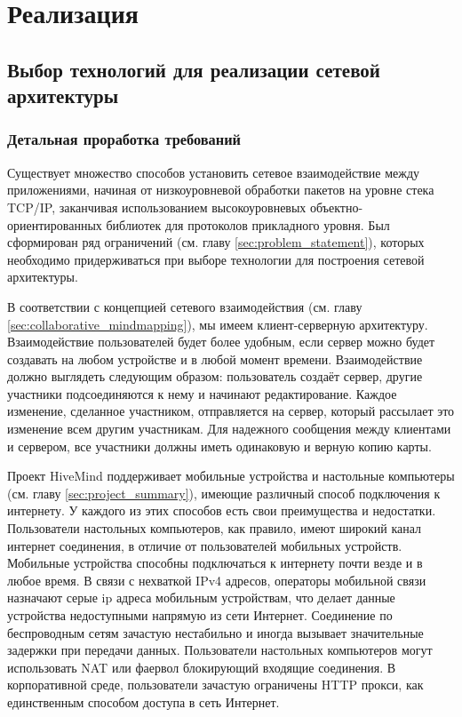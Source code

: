 \newpage

\chapter{Реализация}
\label{ch:chapter_2}

\section{Выбор технологий для реализации сетевой архитектуры}

\subsection{Детальная проработка требований}
Существует множество способов установить сетевое взаимодействие между
приложениями, начиная от низкоуровневой обработки пакетов на уровне стека
TCP/IP, заканчивая использованием высокоуровневых объектно-ориентированных
библиотек для протоколов прикладного уровня. Был сформирован ряд ограничений
(см. главу \ref{sec:problem_statement}), которых необходимо придерживаться при
выборе технологии для построения сетевой архитектуры.

В соответствии с концепцией сетевого взаимодействия (см. главу
\ref{sec:collaborative_mindmapping}), мы имеем клиент-серверную архитектуру.
Взаимодействие пользователей будет более удобным, если сервер можно будет
создавать на любом устройстве и в любой момент времени. Взаимодействие должно
выглядеть следующим образом: пользователь создаёт сервер, другие участники
подсоединяются к нему и начинают редактирование. Каждое изменение, сделанное
участником, отправляется на сервер, который рассылает это изменение всем другим
участникам. Для надежного сообщения между клиентами и сервером, все участники
должны иметь одинаковую и верную копию карты.

Проект HiveMind поддерживает мобильные устройства и настольные компьютеры (см.
главу \ref{sec:project_summary}), имеющие различный способ подключения к
интернету. У каждого из этих способов есть свои преимущества и
недостатки. Пользователи настольных компьютеров, как правило, имеют широкий
канал интернет соединения, в отличие от пользователей мобильных устройств.
Мобильные устройства способны подключаться к интернету почти везде и в любое
время. В связи с нехваткой IPv4 адресов, операторы мобильной связи назначают
серые ip адреса мобильным устройствам, что делает данные устройства недоступными
напрямую из сети Интернет. Соединение по беспроводным сетям зачастую нестабильно
и иногда вызывает значительные задержки при передачи данных. Пользователи
настольных компьютеров могут использовать NAT или фаервол блокирующий
входящие соединения. В корпоративной среде, пользователи зачастую ограничены
HTTP прокси, как единственным способом доступа в сеть Интернет.

